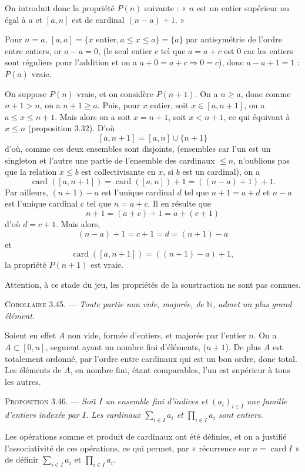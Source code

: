 On introduit donc la propriété $P(n)$ suivante : « $n$ est un entier supérieur ou égal à $a$ et $[a,n]$ est de cardinal $(n-a)+1$. »

Pour $n=a$, $[a,a]=\{x\text{ entier},a\le x\le a\}=\{a\}$ par antisymétrie de l'ordre entre entiers, or $a-a=0$, (le seul entier $c$ tel que $a=a+c$ est $0$ car les entiers sont réguliers pour l'addition et on a $a+0=a+c\Rightarrow0=c$), donc $a-a+1=1$ : $P(a)$ vraie.

On suppose $P(n)$ vraie, et on considère $P(n+1)$. On a $n\ge a$, donc comme $n+1>n$, on a $n+1\ge a$. Puis, pour $x$ entier, soit $x\in[a,n+1]$, on a $a\le x\le n+1$. Mais alors on a soit $x=n+1$, soit $x<n+1$, ce qui équivaut à $x\le n$ (proposition 3.32). D'où
\[
[a,n+1]=[a,n]\cup\{n+1\}
\]
d'où, comme ces deux ensembles sont disjoints, (ensembles car l'un est un singleton et l'autre une partie de l'ensemble des cardinaux $\le n$, n'oublions pas que la relation $x\le b$ est collectivisante en $x$, si $b$ est un cardinal), on a
\[
\operatorname{card}([a,n+1])=\operatorname{card}([a,n])+1=((n-a)+1)+1.
\]
Par ailleurs, $(n+1)-a$ est l'unique cardinal $d$ tel que $n+1=a+d$ et $n-a$ est l'unique cardinal $c$ tel que $n=a+c$. Il en résulte que
\[
n+1=(a+c)+1=a+(c+1)
\]
d'où $d=c+1$. Mais alors,
\[
(n-a)+1=c+1=d=(n+1)-a
\]
et
\[
\operatorname{card}([a,n+1])=((n+1)-a)+1,
\]
la propriété $P(n+1)$ est vraie. \bookend

Attention, à ce stade du jeu, les propriétés de la soustraction ne sont pas connues.

\medskip\noindent\textsc{Corollaire 3.45.} --- \emph{Toute partie non vide, majorée, de $\mathbb N$, admet un plus grand élément.}

Soient en effet $A$ non vide, formée d'entiers, et majorée par l'entier $n$. On a $A\subset[0,n]$, segment ayant un nombre fini d'éléments, ($n+1$). De plus $A$ est totalement ordonné, par l'ordre entre cardinaux qui est un bon ordre, donc total. Les éléments de $A$, en nombre fini, étant comparables, l'un est supérieur à tous les autres.

\medskip\noindent\textsc{Proposition 3.46.} --- \emph{Soit $I$ un ensemble fini d'indices et $(a_i)_{i\in I}$ une famille d'entiers indexée par $I$. Les cardinaux $\sum_{i\in I}a_i$ et $\prod_{i\in I}a_i$ sont entiers.}

Les opérations somme et produit de cardinaux ont été définies, et on a justifié l'associativité de ces opérations, ce qui permet, par « récurrence sur $n=\operatorname{card}I$ » de définir $\sum_{i\in I}a_i$ et $\prod_{i\in I}a_i$.


